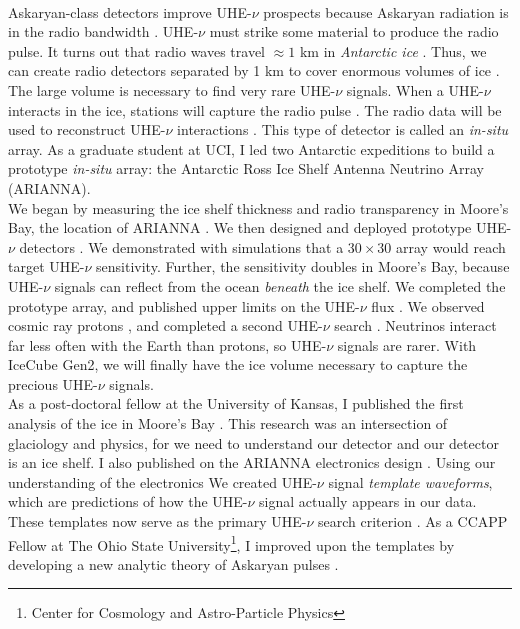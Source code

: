 \documentclass[../../main.tex]{subfiles}
\begin{document}
\\
\vspace{0.15cm}
Askaryan-class detectors improve UHE-$\nu$ prospects because Askaryan radiation is in the radio bandwidth \cite{10.1016/j.astropartphys.2017.03.008}.  UHE-$\nu$ must strike some material to produce the radio pulse.  It turns out that radio waves travel $\approx 1$ km in \textit{Antarctic ice} \cite{10.3189/2015jog14j214} \cite{10.3189/2015jog15j057} \cite{barwick_besson_gorham_saltzberg_2005}.  Thus, we can create radio detectors separated by 1 km to cover enormous volumes of ice \cite{10.1109/tns.2015.2468182}.  The large volume is necessary to find very rare UHE-$\nu$ signals.  When a UHE-$\nu$ interacts in the ice, stations will capture the radio pulse \cite{sst}.  The radio data will be used to reconstruct UHE-$\nu$ interactions \cite{10.1088/1475-7516/2019/11/030} \cite{10.1088/1748-0221/15/09/p09039}.  This type of detector is called an \textit{in-situ} array.  As a graduate student at UCI, I led two Antarctic expeditions to build a prototype \textit{in-situ} array: the Antarctic Ross Ice Shelf Antenna Neutrino Array (ARIANNA).
\\
\vspace{0.15cm}
We began by measuring the ice shelf thickness and radio transparency in Moore's Bay, the location of ARIANNA \cite{icrc}.  We then designed and deployed prototype UHE-$\nu$ detectors \cite{10.1109/tns.2015.2468182} \cite{10.1016/j.nima.2010.09.032}.  We demonstrated with simulations that a $30 \times 30$ array would reach target UHE-$\nu$ sensitivity.  Further, the sensitivity doubles in Moore's Bay, because UHE-$\nu$ signals can reflect from the ocean \textit{beneath} the ice shelf.  We completed the prototype array, and published upper limits on the UHE-$\nu$ flux \cite{10.1016/j.astropartphys.2015.04.002}.  We observed cosmic ray protons \cite{cr}, and completed a second UHE-$\nu$ search \cite{4_5}.  Neutrinos interact far less often with the Earth than protons, so UHE-$\nu$ signals are rarer.  With IceCube Gen2, we will finally have the ice volume necessary to capture the precious UHE-$\nu$ signals.
\\
\vspace{0.15cm}
As a post-doctoral fellow at the University of Kansas, I published the first analysis of the ice in Moore's Bay \cite{10.3189/2015jog14j214}.  This research was an intersection of glaciology and physics, for we need to understand our detector and our detector is an ice shelf.  I also published on the ARIANNA electronics design \cite{10.1016/j.astropartphys.2014.09.002}.  Using our understanding of the electronics We created UHE-$\nu$ signal \textit{template waveforms}, which are predictions of how the UHE-$\nu$ signal actually appears in our data.  These templates now serve as the primary UHE-$\nu$ search criterion \cite{10.1016/j.astropartphys.2015.04.002} \cite{4_5}.  As a CCAPP Fellow at The Ohio State University\footnote{Center for Cosmology and Astro-Particle Physics}, I improved upon the templates by developing a new analytic theory of Askaryan pulses \cite{10.1016/j.astropartphys.2017.03.008}.
\end{document}
